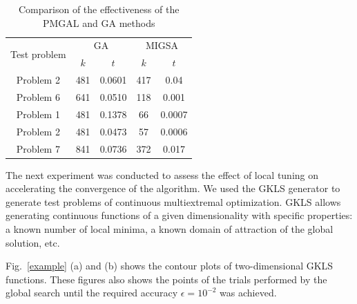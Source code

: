 \documentclass[
11pt,%
tightenlines,%
twoside,%
onecolumn,%
nofloats,%
nobibnotes,%
nofootinbib,%
superscriptaddress,%
noshowpacs,%
centertags]%
{revtex4}
\begin{document}
\begin{table}
	\caption{Comparison of the effectiveness of the PMGAL and GA methods}
	\label{tab:1}
	\center
	\begin{tabular}{|c|c|c|c|c|}
		\hline
	\multirow{2}{*}{Test problem}	 & \multicolumn{2}{c|}{ GA } &  \multicolumn{2}{c|}{MIGSA} \\
		\cline{2-3} \cline{4-5} 
		 & $k$ & $t$ &  $k$ & $t$  \\
		\hline 
		 Problem 2 \cite{Floudas}&	481 &	0.0601 & 	417 &	0.04 \\
		 Problem 6 \cite{Floudas}&	641 &	0.0510 & 	118 &	0.001 \\
		 Problem 1 \cite{Deep}   &	481 &	0.1378 & 	66 &	0.0007 \\
		 Problem 2 \cite{Deep}   &	481 &	0.0473 & 	57 &	0.0006 \\
		 Problem 7 \cite{Deep}   &	841 &	0.0736 &  372	 &	0.017 \\
		\hline
	\end{tabular}
\end{table}	


The next experiment was conducted to assess the effect of local tuning on accelerating the convergence of the algorithm. We used the GKLS generator \cite{Gaviano} to generate test problems of continuous multiextremal optimization. GKLS allows generating continuous functions of a given dimensionality with specific properties: a known number of local minima, a known domain of attraction of the global solution, etc.  

Fig.~\ref{example} (a) and (b) shows the contour plots of two-dimensional GKLS functions. These figures also shows the points of the trials performed by the global search until the required accuracy $\epsilon=10^{-2}$ was achieved.
\end{document}
